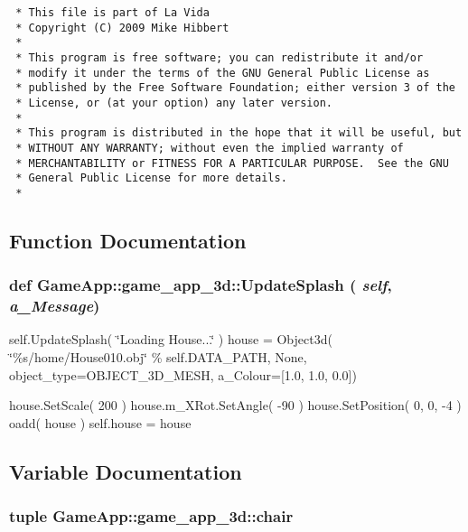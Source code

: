 \footnotesize\begin{verbatim}
 * This file is part of La Vida
 * Copyright (C) 2009 Mike Hibbert
 *
 * This program is free software; you can redistribute it and/or
 * modify it under the terms of the GNU General Public License as
 * published by the Free Software Foundation; either version 3 of the
 * License, or (at your option) any later version.
 *
 * This program is distributed in the hope that it will be useful, but
 * WITHOUT ANY WARRANTY; without even the implied warranty of
 * MERCHANTABILITY or FITNESS FOR A PARTICULAR PURPOSE.  See the GNU
 * General Public License for more details.
 *
\end{verbatim}
\normalsize
 

\subsection{Function Documentation}
\hypertarget{namespaceGameApp_1_1game__app__3d_a3085aa95bfb5219ad8cd68da221b8c1}{
\subsubsection[UpdateSplash]{\setlength{\rightskip}{0pt plus 5cm}def GameApp::game\_\-app\_\-3d::UpdateSplash ( {\em self}, \/   {\em a\_\-Message})}}
\label{namespaceGameApp_1_1game__app__3d_a3085aa95bfb5219ad8cd68da221b8c1}


self.UpdateSplash( \char`\"{}Loading House...\char`\"{} ) house = Object3d( \char`\"{}\%s/home/House010.obj\char`\"{} \% self.DATA\_\-PATH, None, object\_\-type=OBJECT\_\-3D\_\-MESH, a\_\-Colour=\mbox{[}1.0, 1.0, 0.0\mbox{]}) 

house.SetScale( 200 ) house.m\_\-XRot.SetAngle( -90 ) house.SetPosition( 0, 0, -4 ) oadd( house ) self.house = house 

\subsection{Variable Documentation}
\hypertarget{namespaceGameApp_1_1game__app__3d_29293ccb6c6bb28b0f15c70b628df5eb}{
\subsubsection[chair]{\setlength{\rightskip}{0pt plus 5cm}tuple {\bf GameApp::game\_\-app\_\-3d::chair}}}
\label{namespaceGameApp_1_1game__app__3d_29293ccb6c6bb28b0f15c70b628df5eb}


